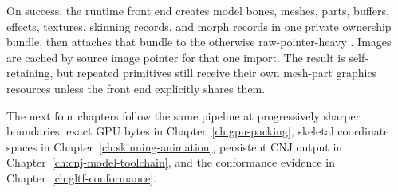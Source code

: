 On success, the runtime front end creates model bones, meshes, parts, buffers, effects,
textures, skinning records, and morph records in one private ownership bundle, then attaches
that bundle to the otherwise raw-pointer-heavy . Images are cached by source
image pointer for that one import. The result is self-retaining, but repeated primitives still
receive their own mesh-part graphics resources unless the front end explicitly shares them.

The next four chapters follow the same pipeline at progressively sharper boundaries: exact GPU
bytes in Chapter~\ref{ch:gpu-packing}, skeletal coordinate spaces in
Chapter~\ref{ch:skinning-animation}, persistent CNJ output in
Chapter~\ref{ch:cnj-model-toolchain}, and the conformance evidence in
Chapter~\ref{ch:gltf-conformance}.
